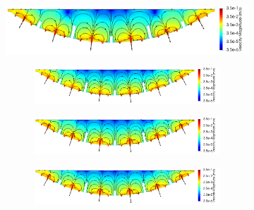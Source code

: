             \begin{figure}
                \centering
                \begin{subfigure}[b]{\textwidth}
                    \centering
                    \includegraphics[width=\textwidth]{diagrams/results-modelling/velocity-transport/meshandsoln_dg_velocity_placenta_nsb_velocity-log.png}
                    \caption{}
                    \label{fig:4-models-placenta:nsb}
                \begin{subfigure}[b]{\textwidth}
                    \centering
                    \includegraphics[width=\textwidth]{diagrams/results-modelling/velocity-transport/meshandsoln_dg_velocity_placenta_s-b_velocity-log.png}
                    \caption{}
                    \label{fig:4-models-placenta:s-b}
                \end{subfigure}
                \begin{subfigure}[b]{\textwidth}
                    \centering
                    \includegraphics[width=\textwidth]{diagrams/results-modelling/velocity-transport/meshandsoln_dg_velocity_placenta_ns-b_velocity-log.png}
                    \caption{}
                    \label{fig:4-models-placenta:ns-b}
                \end{subfigure}
                \begin{subfigure}[b]{\textwidth}
                    \centering
                    \includegraphics[width=\textwidth]{diagrams/results-modelling/velocity-transport/meshandsoln_dg_velocity_placenta_ns-nsb_velocity-log.png}

\end{subfigure}
\end{subfigure}
\end{figure}
